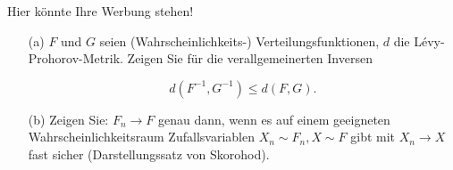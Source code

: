 \begin{exercise}

Hier könnte Ihre Werbung stehen!

\begin{itemize}
    \item[(a)] $F$ und $G$ seien (Wahrscheinlichkeits-) Verteilungsfunktionen, $d$ die Lévy-Prohorov-Metrik. Zeigen Sie für die verallgemeinerten Inversen

    \begin{equation*}
      d(F^{-1},G^{-1}) \leq d(F,G).
    \end{equation*}

    \item[(b)] Zeigen Sie: $F_n \longrightarrow F$ genau dann, wenn es auf einem geeigneten Wahrscheinlichkeitsraum Zufallsvariablen $X_n \sim F_n, X \sim F$ gibt mit $X_n \rightarrow X$ fast sicher (Darstellungssatz von Skorohod).
\end{itemize}

\end{exercise}

